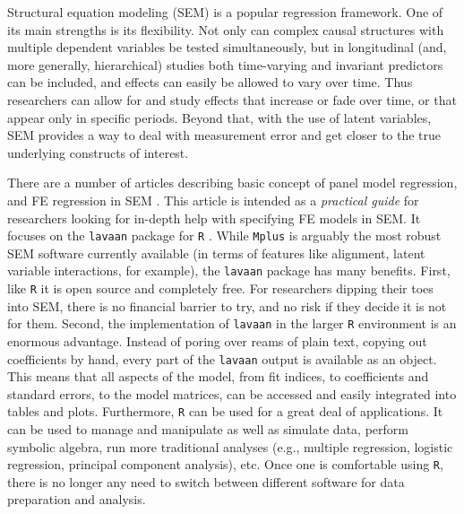 \documentclass[]{interact}
\theoremstyle{plain}%
\theoremstyle{definition}
\theoremstyle{remark}
\begin{document}
Structural equation modeling (SEM) is a popular regression framework.
One of its main strengths is its flexibility. Not only can complex
causal structures with multiple dependent variables be tested
simultaneously, but in longitudinal (and, more generally, hierarchical)
studies both time-varying and invariant predictors can be included, and
effects can easily be allowed to vary over time. Thus researchers can
allow for and study effects that increase or fade over time, or that
appear only in specific periods. Beyond that, with the use of latent
variables, SEM provides a way to deal with measurement error and get
closer to the true underlying constructs of interest.

There are a number of articles describing basic concept of panel model
regression, and FE regression in SEM
\citep[e.g.,][]{Allison2011, Bollen2010, Teachman2001}. This article is
intended as a \textit{practical guide} for researchers looking for
in-depth help with specifying FE models in SEM. It focuses on the
\texttt{lavaan} \citep{R-lavaan} package for \texttt{R} \citep{R-base}.
While \texttt{Mplus} \citep{Mplus} is arguably the most robust SEM
software currently available (in terms of features like alignment,
latent variable interactions, for example), the \texttt{lavaan} package
has many benefits. First, like \texttt{R} it is open source and
completely free. For researchers dipping their toes into SEM, there is
no financial barrier to try, and no risk if they decide it is not for
them. Second, the implementation of \texttt{lavaan} in the larger
\texttt{R} environment is an enormous advantage. Instead of poring over
reams of plain text, copying out coefficients by hand, every part of the
\texttt{lavaan} output is available as an object. This means that all
aspects of the model, from fit indices, to coefficients and standard
errors, to the model matrices, can be accessed and easily integrated
into tables and plots. Furthermore, \texttt{R} can be used for a great
deal of applications. It can be used to manage and manipulate as well as
simulate data, perform symbolic algebra, run more traditional analyses
(e.g., multiple regression, logistic regression, principal component
analysis), etc. Once one is comfortable using \texttt{R}, there is no
longer any need to switch between different software for data
preparation and analysis.
\end{document}
